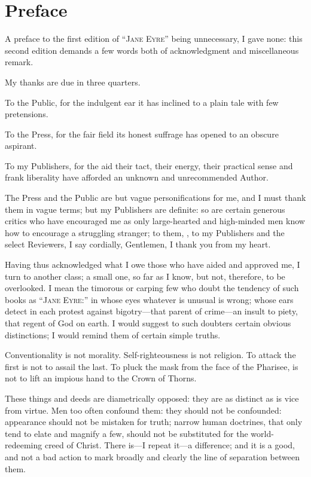 \chapter{Preface}

A preface to the first edition of \enquote{\textsc{Jane Eyre}} being unnecessary,
I gave none: this second edition demands a few words both of
acknowledgment and miscellaneous remark.

My thanks are due in three quarters.

To the Public, for the indulgent ear it has inclined to a plain tale
with few pretensions.

To the Press, for the fair field its honest suffrage has opened to an
obscure aspirant.

To my Publishers, for the aid their tact, their energy, their practical
sense and frank liberality have afforded an unknown and unrecommended
Author.

The Press and the Public are but vague personifications for me, and I
must thank them in vague terms; but my Publishers are definite: so are
certain generous critics who have encouraged me as only large-hearted
and high-minded men know how to encourage a struggling stranger; to
them, \emph{\ie}, to my Publishers and the select Reviewers, I say
cordially, Gentlemen, I thank you from my heart.

Having thus acknowledged what I owe those who have aided and approved
me, I turn to another class; a small one, so far as I know, but not,
therefore, to be overlooked.  I mean the timorous or carping few who
doubt the tendency of such books as \enquote{\textsc{Jane Eyre:}} in whose eyes
whatever is unusual is wrong; whose ears detect in each protest against
bigotry---that parent of crime---an insult to piety, that regent of God
on earth.  I would suggest to such doubters certain obvious
distinctions; I would remind them of certain simple truths.

Conventionality is not morality.  Self-righteousness is not religion.
To attack the first is not to assail the last.  To pluck the mask from
the face of the Pharisee, is not to lift an impious hand to the Crown of
Thorns.

These things and deeds are diametrically opposed: they are as distinct
as is vice from virtue.  Men too often confound them: they should not be
confounded: appearance should not be mistaken for truth; narrow human
doctrines, that only tend to elate and magnify a few, should not be
substituted for the world-redeeming creed of Christ.  There is---I
repeat it---a difference; and it is a good, and not a bad action to mark
broadly and clearly the line of separation between them.


